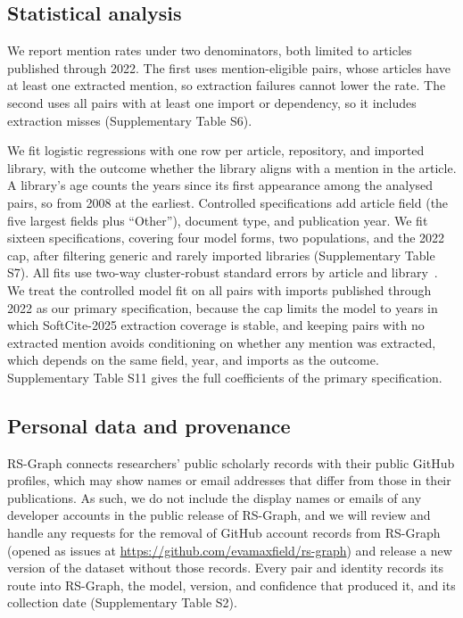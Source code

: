 \documentclass[pdflatex,sn-nature]{sn-jnl}%
\begin{document}
\subsection{Statistical analysis}\label{subsec:m-statistics}

We report mention rates under two denominators, both limited to articles published through 2022.
The first uses mention-eligible pairs, whose articles have at least one extracted mention, so extraction failures cannot lower the rate.
The second uses all pairs with at least one import or dependency, so it includes extraction misses (Supplementary Table S6).

We fit logistic regressions with one row per article, repository, and imported library, with the outcome whether the library aligns with a mention in the article.
A library's age counts the years since its first appearance among the analysed pairs, so from 2008 at the earliest.
Controlled specifications add article field (the five largest fields plus ``Other''), document type, and publication year.
We fit sixteen specifications, covering four model forms, two populations, and the 2022 cap, after filtering generic and rarely imported libraries (Supplementary Table S7).
All fits use two-way cluster-robust standard errors by article and library~\cite{cameron2011robust}.
We treat the controlled model fit on all pairs with imports published through 2022 as our primary specification, because the cap limits the model to years in which SoftCite-2025 extraction coverage is stable, and keeping pairs with no extracted mention avoids conditioning on whether any mention was extracted, which depends on the same field, year, and imports as the outcome.
Supplementary Table S11 gives the full coefficients of the primary specification.

\subsection{Personal data and provenance}\label{subsec:m-provenance}

RS-Graph connects researchers' public scholarly records with their public GitHub profiles, which may show names or email addresses that differ from those in their publications.
As such, we do not include the display names or emails of any developer accounts in the public release of RS-Graph, and we will review and handle any requests for the removal of GitHub account records from RS-Graph (opened as issues at \url{https://github.com/evamaxfield/rs-graph}) and release a new version of the dataset without those records.
Every pair and identity records its route into RS-Graph, the model, version, and confidence that produced it, and its collection date (Supplementary Table S2).
\end{document}
